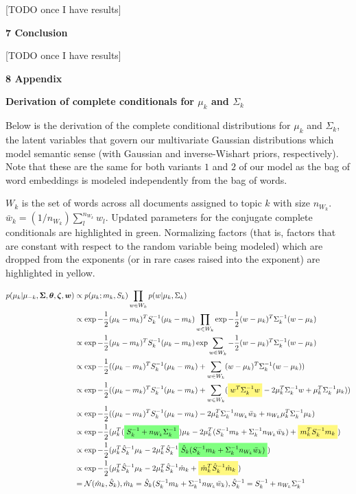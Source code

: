 \documentclass[12pt]{article}
\newcommand{\ghighlight}[1]{%
  \colorbox{green!50}{$\displaystyle#1$}}
\newcommand{\yhighlight}[1]{%
  \colorbox{yellow!50}{$\displaystyle#1$}}
\begin{document}
[TODO once I have results]

\textbf{7 Conclusion}

[TODO once I have results]

\textbf{8 Appendix}

\textbf{Derivation of complete conditionals for $\mu_k$ and $\Sigma_k$}

Below is the derivation of the complete conditional distributions for $\mu_k$ and $\Sigma_k$, the latent variables that govern our multivariate Gaussian distributions which model semantic sense (with Gaussian and inverse-Wishart priors, respectively).  Note that these are the same for both variants $1$ and $2$ of our model as the bag of word embeddings is modeled independently from the bag of words.

$W_k$ is the set of words across all documents assigned to topic $k$ with size $n_{W_k}$.  $\bar{w}_k = (1/n_{W_k})\sum^{n_{W_k}}_l w_l$.  Updated parameters for the conjugate complete conditionals are highlighted in green.  Normalizing factors (that is, factors that are constant with respect to the random variable being modeled) which are dropped from the exponents (or in rare cases raised into the exponent) are highlighted in yellow.

\begin{align*}
p(\mu_k | \mu_{-k}, \bm{\Sigma}, \bm{\theta}, \bm{\zeta}, \bm{w}) & \propto p(\mu_k; m_k, S_k) \prod_{w \in W_k} p(w | \mu_k, \Sigma_k) \\
& \propto \exp{-\frac{1}{2}(\mu_k - m_k)^T S_k^{-1} (\mu_k - m_k)} \prod_{w \in W_k} \exp{-\frac{1}{2}(w - \mu_k)^T \Sigma_k^{-1} (w - \mu_k)} \\
& \propto \exp{-\frac{1}{2}(\mu_k - m_k)^T S_k^{-1} (\mu_k - m_k)} \exp{\sum_{w \in W_k} -\frac{1}{2}(w - \mu_k)^T \Sigma_k^{-1} (w - \mu_k)} \\
& \propto \exp{-\frac{1}{2}((\mu_k - m_k)^T S_k^{-1} (\mu_k - m_k) + \sum_{w \in W_k} (w - \mu_k)^T \Sigma_k^{-1} (w - \mu_k))} \\
& \propto \exp{-\frac{1}{2}((\mu_k - m_k)^T S_k^{-1} (\mu_k - m_k) + \sum_{w \in W_k}(\yhighlight{w^T\Sigma_k^{-1}w} - 2 \mu_k^T\Sigma_k^{-1}w + \mu_k^T\Sigma_k^{-1}\mu_k))} \\
& \propto \exp{-\frac{1}{2}((\mu_k - m_k)^T S_k^{-1} (\mu_k - m_k) - 2 \mu_k^T\Sigma_k^{-1}n_{W_k}\bar{w}_k + n_{W_k}\mu_k^T\Sigma_k^{-1}\mu_k)} \\
& \propto \exp{-\frac{1}{2}(\mu_k^T(\ghighlight{S_k^{-1} + n_{W_k}\Sigma_k^{-1}})\mu_k - 2\mu_k^T(S_k^{-1}m_k + \Sigma_k^{-1}n_{W_k}\bar{w}_k) + \yhighlight{m_k^TS_k^{-1}m_k})} \\
& \propto \exp{-\frac{1}{2}(\mu_k^T\hat{S}_k^{-1}\mu_k - 2\mu_k^T\hat{S}_k^{-1}\ghighlight{\hat{S}_k(S_k^{-1}m_k + \Sigma_k^{-1}n_{W_k}\bar{w}_k)})} \\
& \propto \exp{-\frac{1}{2}(\mu_k^T\hat{S}_k^{-1}\mu_k - 2\mu_k^T\hat{S}_k^{-1}\hat{m}_k + \yhighlight{\hat{m}_k^T\hat{S}_k^{-1}\hat{m}_k})} \\
& = \mathcal{N}(\hat{m}_k, \hat{S}_k), \hat{m}_k = \hat{S}_k(S_k^{-1}m_k + \Sigma_k^{-1}n_{W_k}\bar{w}_k), \hat{S}_k^{-1} = S_k^{-1} + n_{W_k}\Sigma_k^{-1}
\end{align*}
\end{document}
